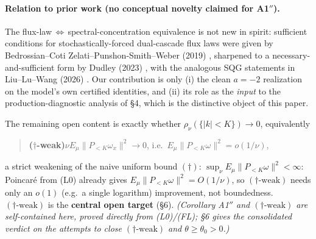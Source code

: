 \documentclass[11pt]{article}
\theoremstyle{remark}
\theoremstyle{plain}
\begin{document}
\paragraph{Relation to prior work (no conceptual novelty claimed for A1$''$).} The
flux-law\,$\iff$\,spectral-concentration equivalence is not new in spirit: sufficient
conditions for stochastically-forced dual-cascade flux laws were given by
Bedrossian--Coti Zelati--Punshon-Smith--Weber (2019) \cite{BCZPSW2020}, sharpened to a
necessary-and-sufficient form by Dudley (2023) \cite{Dudley2023}, with the analogous SQG
statements in Liu--Lu--Wang (2026) \cite{LiuLuWang2026}. Our contribution is only (i) the clean $a=-2$ realization on the
model's own certified identities, and (ii) its role as the \emph{input} to the
production-diagnostic analysis of \S4, which is the distinctive object of this paper.

\noindent The remaining open content is exactly
whether $\rho_\nu(\{|k|<K\}) \to 0$, equivalently

\begin{quote}
\textbf{($\dagger$-weak)}\quad $\nu E_\mu\|P_{<K}\omega_x\|^2 \to 0$, i.e.\ $E_\mu\|P_{<K}\omega\|^2 = o(1/\nu)$,
\end{quote}

a strict weakening of the naive uniform bound $(\dagger)$: $\sup_\nu E_\mu\|P_{<K}\omega\|^2 < \infty$:
Poincar\'e from (L0) already gives $E_\mu\|P_{<K}\omega\|^2 = O(1/\nu)$, so $(\dagger\text{-weak})$ needs only
an $o(1)$ (e.g.\ a single logarithm) improvement, not boundedness. $(\dagger\text{-weak})$ is the
\textbf{central open target} (\S6). \emph{(Corollary A1$''$ and $(\dagger\text{-weak})$ are self-contained here,
proved directly from (L0)/(FL); \S6 gives the consolidated verdict on the attempts to
close $(\dagger\text{-weak})$ and $\theta\ge\theta_0>0$.)}
\end{document}

